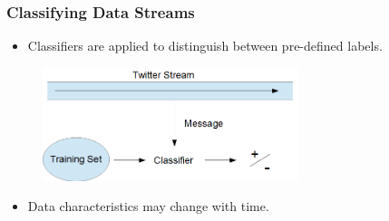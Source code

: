 \documentclass[14pt]{beamer}
\begin{document}
\begin{frame}\frametitle{Classifying Data Streams}

\begin{itemize}
\item Classifiers are applied to distinguish between pre-defined labels.
\end{itemize}

\vspace{-0.2in}
\begin{figure}
\centering
\includegraphics[height=1.30in]{stream1}
\end{figure}
\vspace{-0.2in}
\pause
\begin{itemize}
\item \alert{Data characteristics may change with time}.
\end{itemize}
\end{frame}
\end{document}
